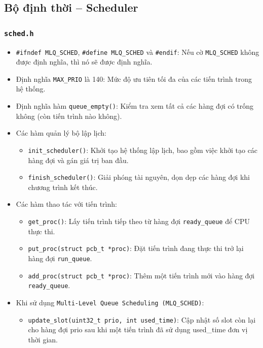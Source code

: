 \subsection{Bộ định thời -- Scheduler}

\subsubsection{\texttt{sched.h}}

\begin{itemize}
    \item \texttt{\#ifndef MLQ\_SCHED}, \texttt{\#define MLQ\_SCHED} và \texttt{\#endif}: Nếu cờ \texttt{MLQ\_SCHED} không được định nghĩa, thì nó sẽ được định nghĩa.
    \item Định nghĩa \texttt{MAX\_PRIO} là 140: Mức độ ưu tiên tối đa của các tiến trình trong hệ thống.
    \item Định nghĩa hàm \texttt{queue\_empty()}: Kiểm tra xem tất cả các hàng đợi có trống không (còn tiến trình nào không).
    \item Các hàm quản lý bộ lập lịch:
    \begin{itemize}
        \item \texttt{init\_scheduler()}: Khởi tạo hệ thống lập lịch, bao gồm việc khởi tạo các hàng đợi và gán giá trị ban đầu.
        \item \texttt{finish\_scheduler()}: Giải phóng tài nguyên, dọn dẹp các hàng đợi khi chương trình kết thúc.
    \end{itemize}
    \item Các hàm thao tác với tiến trình:
    \begin{itemize}
        \item \texttt{get\_proc()}: Lấy tiến trình tiếp theo từ hàng đợi \texttt{ready\_queue} để CPU thực thi.
        \item \texttt{put\_proc(struct pcb\_t *proc)}: Đặt tiến trình đang thực thi trở lại hàng đợi \texttt{run\_queue}.
        \item \texttt{add\_proc(struct pcb\_t *proc)}: Thêm một tiến trình mới vào hàng đợi \texttt{ready\_queue}.
    \end{itemize}
    \item Khi sử dụng \texttt{Multi-Level Queue Scheduling (MLQ\_SCHED)}:
    \begin{itemize}
        \item \texttt{update\_slot(uint32\_t prio, int used\_time)}: Cập nhật số slot còn lại cho hàng đợi prio sau khi một tiến trình đã sử dụng used\_time đơn vị thời gian.

\end{itemize}
\end{itemize}
